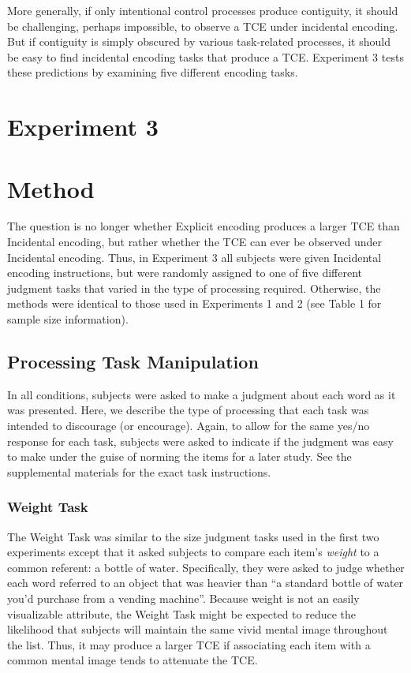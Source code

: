 \documentclass[man,natbib,floatsintext]{apa6} %
\begin{document}
More generally, if only intentional control processes produce contiguity, it should be challenging, perhaps impossible, to observe a TCE under incidental encoding. But if contiguity is simply obscured by various task-related processes, it should be easy to find incidental encoding tasks that produce a TCE. Experiment 3 tests these predictions by examining five different encoding tasks.

\section{Experiment 3}
\section{Method}
The question is no longer whether Explicit encoding produces a larger TCE than Incidental encoding, but rather whether the TCE can ever be observed under Incidental encoding. Thus, in Experiment 3 all subjects were given Incidental encoding instructions, but were randomly assigned to one of five different judgment tasks that varied in the type of processing required. Otherwise, the methods were identical to those used in Experiments 1 and 2 (see Table 1 for sample size information).

\subsection{Processing Task Manipulation}
In all conditions, subjects were asked to make a judgment about each word as it was presented. Here, we describe the type of processing that each task was intended to discourage (or encourage). Again, to allow for the same yes/no response for each task, subjects were asked to indicate if the judgment was easy to make under the guise of norming the items for a later study. See the supplemental materials for the exact task instructions.

\subsubsection{Weight Task} The Weight Task was similar to the size judgment tasks used in the first two experiments except that it asked subjects to compare each item's \emph{weight} to a common referent: a bottle of water. Specifically, they were asked to judge whether each word referred to an object that was heavier than ``a standard bottle of water you'd purchase from a vending machine''. Because weight is not an easily visualizable attribute, the Weight Task might be expected to reduce the likelihood that subjects will maintain the same vivid mental image throughout the list. Thus, it may produce a larger TCE if associating each item with a common mental image tends to attenuate the TCE.
\end{document}
